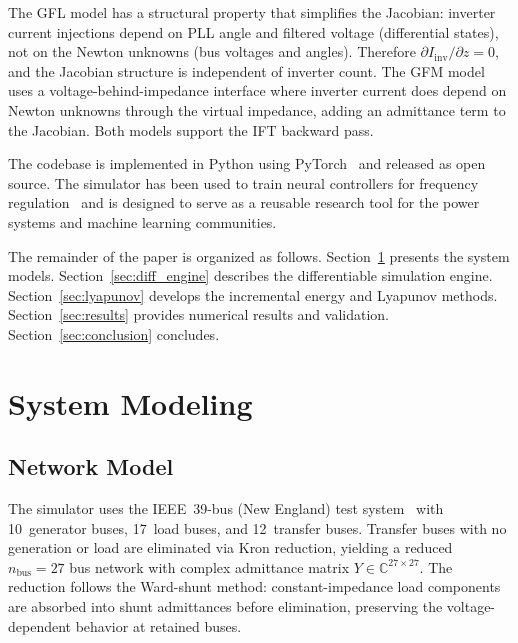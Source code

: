 \documentclass[11pt]{article}
\newcommand{\C}{\mathbb{C}}
\begin{document}
The GFL model has a structural property that simplifies the Jacobian:
inverter current injections depend on PLL angle and filtered voltage
(differential states), not on the Newton unknowns (bus voltages and
angles).  Therefore $\partial I_{\mathrm{inv}} / \partial z = 0$, and
the Jacobian structure is independent of inverter count.  The GFM model
uses a voltage-behind-impedance interface where inverter current does
depend on Newton unknowns through the virtual impedance, adding an
admittance term to the Jacobian.  Both models support the IFT backward
pass.

The codebase is implemented in Python using
PyTorch~\cite{Paszke19PyTorch} and released as open source.  The
simulator has been used to train neural controllers for frequency
regulation~\cite{AlduaijWeng25SGC, AlduaijWengLi25BeyondMonotonic}
and is designed to serve as a reusable research tool for the power
systems and machine learning communities.

The remainder of the paper is organized as follows.
Section~\ref{sec:modeling} presents the system models.
Section~\ref{sec:diff_engine} describes the differentiable simulation
engine.  Section~\ref{sec:lyapunov} develops the incremental energy
and Lyapunov methods.  Section~\ref{sec:results} provides numerical
results and validation.  Section~\ref{sec:conclusion} concludes.

\section{System Modeling}
\label{sec:modeling}

\subsection{Network Model}
\label{sec:network}

The simulator uses the IEEE~39-bus (New England) test
system~\cite{Athay79IEEE39Bus} with 10~generator buses, 17~load
buses, and 12~transfer buses.  Transfer buses with no generation or
load are eliminated via Kron reduction, yielding a reduced
$n_{\mathrm{bus}} = 27$ bus network with complex admittance matrix
$Y \in \C^{27 \times 27}$.  The reduction follows the Ward-shunt
method: constant-impedance load components are absorbed into shunt
admittances before elimination, preserving the voltage-dependent
behavior at retained buses.
\end{document}
